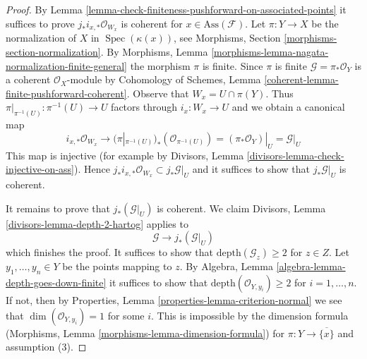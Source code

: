 \documentclass[10pt,a4paper]{amsart}
\theoremstyle{plain}
\theoremstyle{definition}
\theoremstyle{remark}
\numberwithin{equation}{subsection}
\def\Spec{\mathop{\mathrm{Spec}}}
\begin{document}
\begin{proof}
By Lemma \ref{lemma-check-finiteness-pushforward-on-associated-points}
it suffices to prove $j_*i_{x, *}\mathcal{O}_{W_x}$ is coherent
for $x \in \text{Ass}(\mathcal{F})$.
Let $\pi : Y \to X$ be the normalization of $X$ in $\Spec(\kappa(x))$, see
Morphisms, Section \ref{morphisms-section-normalization}. By
Morphisms, Lemma \ref{morphisms-lemma-nagata-normalization-finite-general}
the morphism $\pi$ is finite. Since $\pi$ is finite
$\mathcal{G} = \pi_*\mathcal{O}_Y$ is a coherent $\mathcal{O}_X$-module by
Cohomology of Schemes, Lemma \ref{coherent-lemma-finite-pushforward-coherent}.
Observe that $W_x = U \cap \pi(Y)$. Thus
$\pi|_{\pi^{-1}(U)} : \pi^{-1}(U) \to U$ factors through $i_x : W_x \to U$
and we obtain a canonical map
$$
i_{x, *}\mathcal{O}_{W_x}
\longrightarrow
(\pi|_{\pi^{-1}(U)})_*(\mathcal{O}_{\pi^{-1}(U)}) =
(\pi_*\mathcal{O}_Y)|_U = \mathcal{G}|_U
$$
This map is injective (for example by Divisors, Lemma
\ref{divisors-lemma-check-injective-on-ass}). Hence
$j_*i_{x, *}\mathcal{O}_{W_x} \subset j_*\mathcal{G}|_U$
and it suffices to show that $j_*\mathcal{G}|_U$ is coherent.

\medskip\noindent
It remains to prove that $j_*(\mathcal{G}|_U)$ is coherent. We claim
Divisors, Lemma \ref{divisors-lemma-depth-2-hartog}
applies to
$$
\mathcal{G} \longrightarrow j_*(\mathcal{G}|_U)
$$
which finishes the proof. It suffices to show that
$\text{depth}(\mathcal{G}_z) \geq 2$ for $z \in Z$.
Let $y_1, \ldots, y_n \in Y$ be the points mapping to $z$.
By Algebra, Lemma \ref{algebra-lemma-depth-goes-down-finite}
it suffices to show that
$\text{depth}(\mathcal{O}_{Y, y_i}) \geq 2$ for $i = 1, \ldots, n$.
If not, then by Properties, Lemma \ref{properties-lemma-criterion-normal}
we see that $\dim(\mathcal{O}_{Y, y_i}) = 1$ for some $i$.
This is impossible by the dimension formula
(Morphisms, Lemma \ref{morphisms-lemma-dimension-formula})
for $\pi : Y \to \overline{\{x\}}$ and assumption (3).
\end{proof}
\end{document}
